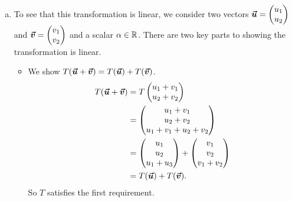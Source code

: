 \documentclass[12pt]{article} %
\begin{document}
\begin{solution}~
    \begin{enumerate}[(a)]
        \item To see that this transformation is linear, we consider two vectors $\boldsymbol{\boldsymbol{\vec{u}}} = \begin{pmatrix} u_1 \\ u_2 \end{pmatrix}$ and $\boldsymbol{\boldsymbol{\vec{v}}} = \begin{pmatrix} v_1 \\ v_2 \end{pmatrix}$ and a scalar $\alpha \in \mathbb{R}$.  There are two key parts to showing the transformation is linear.
        \begin{itemize}
            \item We show $T(\boldsymbol{\boldsymbol{\vec{u}}} + \boldsymbol{\boldsymbol{\vec{v}}}) = T(\boldsymbol{\boldsymbol{\vec{u}}}) + T(\boldsymbol{\boldsymbol{\vec{v}}})$.
            \begin{align*}
                T(\boldsymbol{\boldsymbol{\vec{u}}} + \boldsymbol{\boldsymbol{\vec{v}}}) &= T\begin{pmatrix} u_1 + v_1 \\ u_2 + v_2 \end{pmatrix}\\
                &= \begin{pmatrix} u_1 + v_1 \\ u_2 + v_2 \\ u_1 + v_1 + u_2 + v_2 \end{pmatrix}\\
                &= \begin{pmatrix} u_1 \\ u_2 \\ u_1 + u_3 \end{pmatrix} + \begin{pmatrix} v_1 \\ v_2 \\ v_1 + v_2 \end{pmatrix}\\
                &= T(\boldsymbol{\boldsymbol{\vec{u}}}) + T(\boldsymbol{\boldsymbol{\vec{v}}}).
            \end{align*}
            So $T$ satisfies the first requirement.
            

\end{itemize}
\end{enumerate}
\end{solution}
\end{document}
